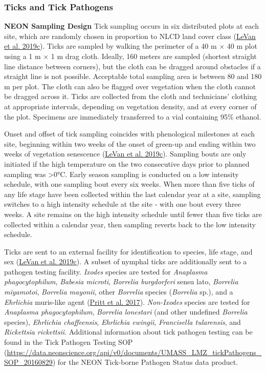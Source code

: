 \documentclass[
  12pt,
]{article}
\begin{document}
\hypertarget{ticks-and-tick-pathogens}{%
\subsubsection{Ticks and Tick Pathogens}\label{ticks-and-tick-pathogens}}

\textbf{NEON Sampling Design} Tick sampling occurs in six distributed plots at each site, which are randomly chosen in proportion to NLCD land cover class (\protect\hyperlink{ref-LeVan2019c}{LeVan et al. 2019c}). Ticks are sampled by walking the perimeter of a 40 m \(\times\) 40 m plot using a 1 m \(\times\) 1 m drag cloth. Ideally, 160 meters are sampled (shortest straight line distance between corners), but the cloth can be dragged around obstacles if a straight line is not possible. Acceptable total sampling area is between 80 and 180 m per plot. The cloth can also be flagged over vegetation when the cloth cannot be dragged across it. Ticks are collected from the cloth and technicians' clothing at appropriate intervals, depending on vegetation density, and at every corner of the plot. Specimens are immediately transferred to a vial containing 95\% ethanol.

Onset and offset of tick sampling coincides with phenological milestones at each site, beginning within two weeks of the onset of green-up and ending within two weeks of vegetation senescence (\protect\hyperlink{ref-LeVan2019c}{LeVan et al. 2019c}). Sampling bouts are only initiated if the high temperature on the two consecutive days prior to planned sampling was \textgreater0°C. Early season sampling is conducted on a low intensity schedule, with one sampling bout every six weeks. When more than five ticks of any life stage have been collected within the last calendar year at a site, sampling switches to a high intensity schedule at the site - with one bout every three weeks. A site remains on the high intensity schedule until fewer than five ticks are collected within a calendar year, then sampling reverts back to the low intensity schedule.

Ticks are sent to an external facility for identification to species, life stage, and sex (\protect\hyperlink{ref-LeVan2019c}{LeVan et al. 2019c}). A subset of nymphal ticks are additionally sent to a pathogen testing facility. \emph{Ixodes} species are tested for \emph{Anaplasma phagocytophilum}, \emph{Babesia microti}, \emph{Borrelia burgdorferi} sensu lato, \emph{Borrelia miyamotoi}, \emph{Borrelia mayonii}, other \emph{Borrelia} species (\emph{Borrelia} sp.), and a \emph{Ehrlichia} muris-like agent (\protect\hyperlink{ref-pritt2017proposal}{Pritt et al. 2017}). \emph{Non-Ixodes} species are tested for \emph{Anaplasma phagocytophilum}, \emph{Borrelia lonestari} (and other undefined \emph{Borrelia} species), \emph{Ehrlichia chaffeensis}, \emph{Ehrlichia ewingii}, \emph{Francisella tularensis}, and \emph{Rickettsia rickettsii}. Additional information about tick pathogen testing can be found in the Tick Pathogen Testing SOP (\url{https://data.neonscience.org/api/v0/documents/UMASS_LMZ_tickPathogens_SOP_20160829}) for the NEON Tick-borne Pathogen Status data product.
\end{document}
